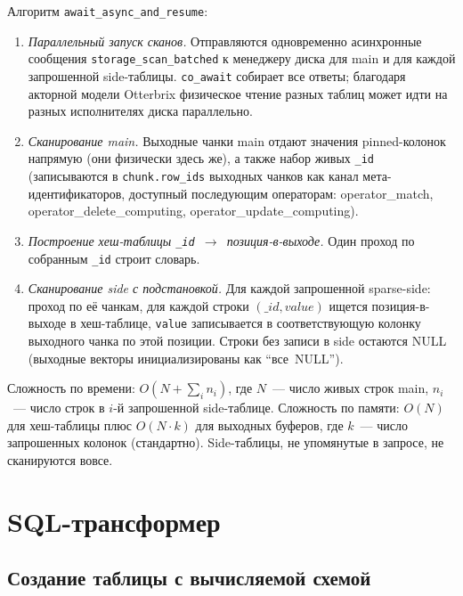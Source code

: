 Алгоритм \texttt{await\_async\_and\_resume}:

\begin{enumerate}
    \item \emph{Параллельный запуск сканов.} Отправляются
    одновременно асинхронные сообщения
    \texttt{storage\_scan\_batched} к менеджеру диска для main и
    для каждой запрошенной side-таблицы. \texttt{co\_await}
    собирает все ответы; благодаря акторной модели Otterbrix
    физическое чтение разных таблиц может идти на разных
    исполнителях диска параллельно.
    \item \emph{Сканирование main.} Выходные чанки main отдают
    значения pinned-колонок напрямую (они физически здесь же), а
    также набор живых \texttt{\_id} (записываются в
    \texttt{chunk.row\_ids} выходных чанков как канал
    мета-идентификаторов, доступный последующим операторам:
    operator\_match, operator\_delete\_computing,
    operator\_update\_computing).
    \item \emph{Построение хеш-таблицы
    \texttt{\_id}~$\to$~позиция-в-выходе.} Один проход по
    собранным \texttt{\_id} строит словарь.
    \item \emph{Сканирование side с подстановкой.} Для каждой
    запрошенной sparse-side: проход по её чанкам, для каждой
    строки $(\_id, value)$ ищется позиция-в-выходе в хеш-таблице,
    \texttt{value} записывается в соответствующую колонку
    выходного чанка по этой позиции. Строки без записи в side
    остаются NULL (выходные векторы инициализированы как
    ``все~NULL'').
\end{enumerate}

Сложность по времени: $O(N + \sum_i n_i)$, где $N$~--- число
живых строк main, $n_i$~--- число строк в $i$-й запрошенной
side-таблице. Сложность по памяти: $O(N)$ для хеш-таблицы плюс
$O(N \cdot k)$ для выходных буферов, где $k$~--- число запрошенных
колонок (стандартно). Side-таблицы, не упомянутые в запросе, не
сканируются вовсе.

\section{SQL-трансформер}

\subsection{Создание таблицы с вычисляемой схемой}

